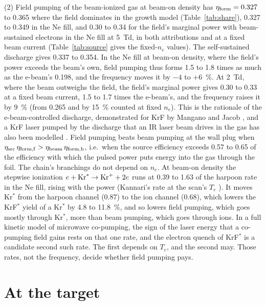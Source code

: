 \documentclass[11pt]{article}
\numberwithin{equation}{section}
\begin{document}
{\noindent}(2) Field pumping of the beam-ionized gas at beam-on density has
$\eta_{\rm form}=0.327$ to 0.365 where the field dominates in the growth model
(Table~\ref{tab:share}), 0.327 to 0.349 in the Ne fill, and 0.30 to 0.34 for the field's
marginal power with beam-sustained electrons in the Ne fill at 5~Td, in both attributions
and at a fixed beam current (Table~\ref{tab:source} gives the fixed-$n_e$ values). The self-sustained discharge
gives 0.337 to 0.354. In the Ne fill at beam-on density, where the field's power exceeds
the beam's own, field pumping thus forms 1.5 to 1.8 times as much as the e-beam's 0.198,
and the frequency moves it by $-4$ to $+6$~\%. At 2~Td, where the beam outweighs the
field, the field's marginal power gives 0.30 to 0.33 at a fixed beam current, 1.5 to 1.7
times the e-beam's, and the frequency raises it by 9~\% (from 0.265 and by 15~\% counted
at fixed $n_e$). This is the rationale of the e-beam-controlled discharge, demonstrated for
KrF by Mangano and Jacob \cite{ManganoJacob1975}, and a KrF laser pumped by the
discharge that an IR laser beam drives in the gas has also been modelled
\cite{Igoshin1993}. Field pumping beats beam pumping at the wall plug when
$\eta_{\rm src}\,\eta_{\rm form,f}>\eta_{\rm beam}\,\eta_{\rm form,b}$, i.e.\ when the
source efficiency exceeds 0.57 to 0.65 of the efficiency with which the pulsed power
puts energy into the gas through the foil. The chain's branchings do not depend on
$n_e$. At beam-on density the stepwise ionization $e+{\rm Kr}^*\to{\rm Kr}^++2e$ runs at
0.39 to 1.63 of the harpoon rate in the Ne fill, rising with the power (Kannari's rate
at the scan's $T_e$ \cite{Kannari1985}). It moves Kr$^*$ from the harpoon channel (0.87) to
the ion channel (0.68), which lowers the KrF$^*$ yield of a Kr$^*$ by 4.8 to 11.8~\%,
and so lowers field pumping, which goes mostly through Kr$^*$, more than beam pumping,
which goes through ions. In a full kinetic model of microwave co-pumping, the sign
of the laser energy that a co-pumping field gains rests on that one rate, and the
electron quench of KrF$^*$ is a candidate second such rate. The first
depends on $T_e$, and the second may. Those rates, not the frequency,
decide whether field pumping pays.

\section{At the target}
\label{sec:ife}
\end{document}
